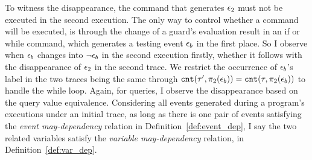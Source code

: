 {{To witness
the disappearance, the command that generates $\mathtt{\epsilon}_2$ must not be executed in 
the second execution. 
The only way to control whether a command will be executed, is through the change of a guard's 
evaluation result in an if or while command, which generates a testing event $\mathtt{\epsilon}_b$ in the first place.
So I observe when
$\mathtt{\epsilon}_b$ changes into $\neg \mathtt{\epsilon}_b$ in the second execution firstly, 
whether it follows with the disappearance of $\mathtt{\epsilon}_2$ in the second trace. We restrict the occurrence of $\mathtt{\epsilon}_b$'s label in the two traces being the same
}
through $\mathtt{cnt}(\mathtt{\tau}', \pi_2(\mathtt{\epsilon}_b)) = \mathtt{cnt}(\mathtt{\tau}, \pi_2(\mathtt{\epsilon}_b))$ to handle the while loop.
Again, for queries, I observe the disappearance based on the query value equivalence.
%
{Considering 
all events generated during a program's executions
under an initial trace,
as long as there is one pair of events satisfying the \emph{event may-dependency} relation in Definition~\ref{def:event_dep}, 
 I say the two 
related
variables satisfy the \emph{variable may-dependency} relation, in Definition~\ref{def:var_dep}.
}
}

